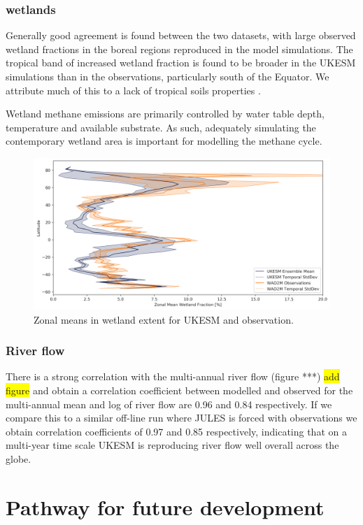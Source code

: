 \documentclass[bg, manuscript]{copernicus}
\newcommand{\hilight}[1]{\colorbox{yellow}{#1}}
\begin{document}
\subsubsection{wetlands}
Generally good agreement is found between the two datasets, with large observed wetland fractions in the boreal regions reproduced in the model simulations. The tropical band of increased wetland fraction is found to be broader in the UKESM simulations than in the observations, particularly south of the Equator. We attribute much of this to a lack of tropical soils properties \citep{Gedney2019}.

Wetland methane emissions are primarily controlled by water table depth, temperature and available substrate. As such, adequately simulating the contemporary wetland area is important for modelling the methane cycle.  

\begin{figure}[t]
    \includegraphics[width=16cm]{figs/Wetland.png}
    \caption{Zonal means in wetland extent for UKESM and observation.  \label{fig:wetland} }
\end{figure}

\subsubsection{River flow}
There is a strong correlation with the multi-annual river flow (figure ***) \hilight{add figure} and obtain a correlation coefficient between modelled and observed for the multi-annual mean and log of river flow are 0.96 and 0.84 respectively. If we compare this to a similar off-line run where JULES is forced with observations we obtain correlation coefficients of 0.97 and 0.85 respectively, indicating that on a multi-year time scale UKESM is reproducing river flow well overall across the globe.

\section{Pathway for future development}
\end{document}

